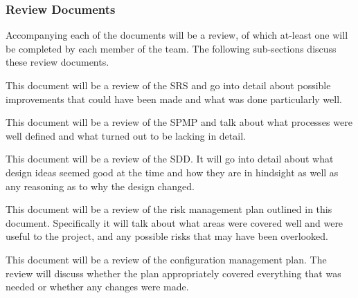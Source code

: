 \documentclass{article}
\newcounter{subsubsubsection}[subsubsection]
\begin{document}
\subsubsection{Review Documents}
\begin{adjustwidth}{2em}{0pt}
Accompanying each of the documents will be a review, of which at-least one will be completed by each member of the team. The following sub-sections discuss these review documents.
\end{adjustwidth}

\begin{adjustwidth}{3em}{0pt}
This document will be a review of the SRS and go into detail about possible improvements that could have been made and what was done particularly well.
\end{adjustwidth}

\begin{adjustwidth}{3em}{0pt}
This document will be a review of the SPMP and talk about what processes were well defined and what turned out to be lacking in detail.
\end{adjustwidth}

\begin{adjustwidth}{3em}{0pt}
This document will be a review of the SDD. It will go into detail about what design ideas seemed good at the time and how they are in hindsight as well as any reasoning as to why the design changed.
\end{adjustwidth}

\begin{adjustwidth}{3em}{0pt}
This document will be a review of the risk management plan outlined in this document. Specifically it will talk about what areas were covered well and were useful to the project, and any possible risks that may have been overlooked. 
\end{adjustwidth}

\begin{adjustwidth}{3em}{0pt}
This document will be a review of the configuration management plan. The review will discuss whether the plan appropriately covered everything that was needed or whether any changes were made.
\end{adjustwidth}
\end{document}
